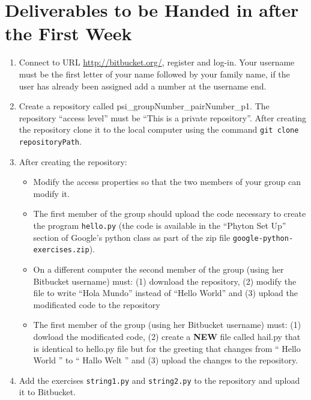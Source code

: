 \documentclass[12pt]{article} %
\newcounter{ejercicioNo}
\begin{document}
\section{Deliverables to be Handed in after the First Week}
\begin{minipage}{\linewidth}
\begin{framed}
\begin{enumerate}
 \item Connect to URL \url{http://bitbucket.org/}, register and log-in. Your username must be the first letter of your name followed by your family name, if the user has already been assigned add a number at the username end.
 \item Create a repository called psi\_groupNumber\_pairNumber\_p1. The repository ``access level''  must be ``This is a private repository''. After creating the repository clone it to the local computer using the command \texttt{git clone repositoryPath}.

\item After creating the repository:
 \begin {itemize}
 \item Modify the access properties so that the two members of your group  can modify it.
 \item  The first member of the group should upload the code necessary to create the program \texttt{hello.py} (the code is available in the ``Phyton Set Up'' section  of Google's python class as part of the zip file  \texttt{google-python-exercises.zip}).
   \item On a different computer the second member of the group (using her Bitbucket username) must: (1) download the repository, (2) modify the file to write ``Hola Mundo'' instead of ``Hello World'' and (3) upload the modificated code to the repository
   \item The first member of the group (using her Bitbucket username) must: (1) dowload the modificated code, (2) create a \textbf{NEW} file called hail.py that is identical to hello.py file but for the greeting that changes from `` Hello World '' to `` Hallo Welt '' and (3) upload the changes to the repository.
\end{itemize}
\item Add the exercises \texttt{string1.py} and \texttt{string2.py} to the repository and upload it to Bitbucket.
\end{enumerate}
\end{framed}
\end{minipage}\\\\
\end{document}
